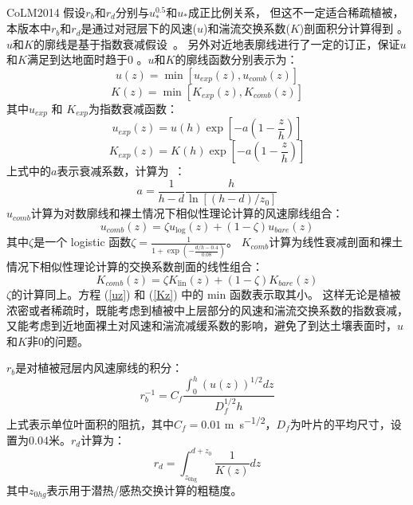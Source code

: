 CoLM2014 假设$r_b$和$r_d$分别与$u_\ast^{0.5}$和$u_\ast$成正比例关系，
但这不一定适合稀疏植被，本版本中$r_b$和$r_d$是通过对冠层下的风速($u$)和湍流交换系数($K$)剖面积分计算得到 \citep{dai2019different}。
$u$和$K$的廓线是基于指数衰减假设~\citep{inoue1963turbulent,cowan1968mass}。
另外对近地表廓线进行了一定的订正，保证$u$和$K$满足到达地面时趋于0 \citep{dai2019different}。$u$和$K$的廓线函数分别表示为：
\begin{equation}\label{uz}
u(z)=\min \left[u_{exp}(z), u_{comb}(z)\right]
\end{equation}
\begin{equation}\label{Kz}
K(z)=\min \left[K_{exp}(z), K_{comb}(z)\right]
\end{equation}
其中$u_{exp}$ 和 $K_{exp}$为指数衰减函数：
\begin{equation}
u_{exp}(z)=u(h) \exp \left[-a\left(1-\frac{z}{h}\right)\right]
\end{equation}
\begin{equation}
K_{exp}(z)=K(h) \exp \left[-a\left(1-\frac{z}{h}\right)\right]
\end{equation}
上式中的$a$表示衰减系数，计算为~\citep{inoue1963turbulent,cowan1968mass,kondo1971relationship}：
\begin{equation}
a=\frac{1}{h-d} \frac{h}{\ln \left[(h-d) / z_{0}\right]}
\end{equation}
$u_{comb}$计算为对数廓线和裸土情况下相似性理论计算的风速廓线组合：
\begin{equation}\label{ucomb}
u_{comb}(z)=\zeta u_{\log }(z)+(1-\zeta) u_{{bare }}(z)
\end{equation}
其中$\zeta$是一个 logistic 函数$\zeta=\frac{1}{1+\exp{\left(-\frac{d/h-0.4}{0.08}\right)}}$。
$K_{comb}$计算为线性衰减剖面和裸土情况下相似性理论计算的交换系数剖面的线性组合：
\begin{equation}\label{kcomb}
K_{comb}(z)=\zeta K_{\mathrm{lin}}(z)+(1-\zeta) K_{bare}(z)
\end{equation}
$\zeta$的计算同上。方程 (\ref{uz}) 和 (\ref{Kz}) 中的 min 函数表示取其小。
这样无论是植被浓密或者稀疏时，既能考虑到植被中上层部分的风速和湍流交换系数的指数衰减，
又能考虑到近地面裸土对风速和湍流减缓系数的影响，避免了到达土壤表面时，$u$和$K$非0的问题。


$r_b$是对植被冠层内风速廓线的积分：
\begin{equation}
r_{b}^{-1}=C_{f} \frac{\int_{0}^{h}(u(z))^{1 / 2} d z}{D_{f}^{1 / 2} h}
\end{equation}
上式表示单位叶面积的阻抗，其中$C_f=0.01$ \unit{m.s^{-1/2}}，$D_f$为叶片的平均尺寸，设置为0.04米。$r_d$计算为：
\begin{equation}\label{r_d1}
r_{d}=\int_{z_{0 \mathrm{hg}}}^{d+z_{0}} \frac{1}{K(z)} d z
\end{equation}
其中$z_{0hg}$表示用于潜热/感热交换计算的粗糙度\citep{zeng1998effect}。


